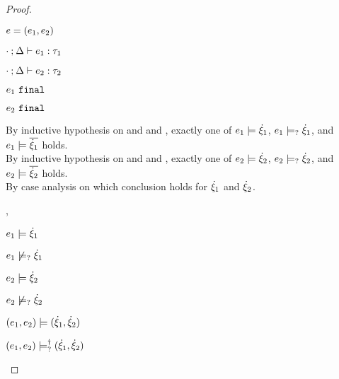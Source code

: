 \begin{proof}
\begin{byCases}
\begin{byCases}
\begin{byCases}
        \end{byCases}
    \item[\text{(\ref{rule:TPair})}]
        \begin{pfsteps*}
        \item $e=(e_1 , e_2)$ 
        \item $\cdot \mathbin{;} \Delta \vdash e_1 : \tau_1$  
        \item $\cdot \mathbin{;} \Delta \vdash e_2 : \tau_2$  
        \item $e_1 ~\mathtt{final}$  
        \item $e_2 ~\mathtt{final}$  
        \end{pfsteps*}
        By inductive hypothesis on  and  and , exactly one of $e_1 \models \dot{\xi}_1$, $e_1 \models_{?} \dot{\xi}_1$, and $e_1 \models \overline{\dot{\xi}_1}$ holds. \\
        By inductive hypothesis on  and  and , exactly one of $e_2 \models \dot{\xi}_2$, $e_2 \models_{?} \dot{\xi}_2$, and $e_2 \models \overline{\dot{\xi}_2}$ holds. \\
        By case analysis on which conclusion holds for $\dot{\xi}_1$ and $\dot{\xi}_2$.
        \begin{byCases}
        \item[\csatisfy{e_1}{\hxi_1},\csatisfy{e_2}{\hxi_2}]
            \begin{pfsteps*}
            \item $e_1 \models \dot{\xi}_1$  
            \item $e_1 \not\models_{?} \dot{\xi}_1$  
            \item $e_2 \models \dot{\xi}_2$  
            \item $e_2 \not\models_{?} \dot{\xi}_2$  
            \item $(e_1 , e_2) \models (\dot{\xi}_1 , \dot{\xi}_2)$  
            \item $(e_1 , e_2) \models_{?}^{\dag} (\dot{\xi}_1 , \dot{\xi}_2)$ 

\end{pfsteps*}
\end{byCases}
\end{byCases}
\end{byCases}
\end{proof}
